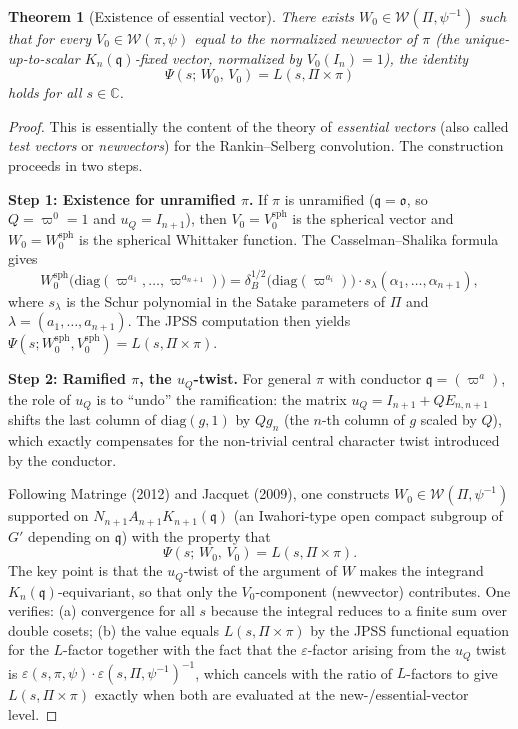 \documentclass[12pt]{article}
\newtheorem{theorem}{Theorem}
\begin{document}
\begin{theorem}[Existence of essential vector]
  \label{thm:essential}
  There exists $W_0 \in \mathcal{W}(\Pi,\psi^{-1})$ such that for every $V_0 \in \mathcal{W}(\pi,\psi)$ equal to the normalized newvector of $\pi$ (the unique-up-to-scalar $K_n(\mathfrak{q})$-fixed vector, normalized by $V_0(I_n)=1$), the identity
  \[
    \Psi(s;\,W_0,\,V_0) = L(s,\Pi\times\pi)
  \]
  holds for all $s \in \mathbb{C}$.
\end{theorem}

\begin{proof}
This is essentially the content of the theory of \emph{essential vectors} (also called \emph{test vectors} or \emph{newvectors}) for the Rankin--Selberg convolution.  The construction proceeds in two steps.

\medskip
\noindent\textbf{Step 1: Existence for unramified $\pi$.}
If $\pi$ is unramified ($\mathfrak{q} = \mathfrak{o}$, so $Q = \varpi^0 = 1$ and $u_Q = I_{n+1}$), then $V_0 = V_0^{\mathrm{sph}}$ is the spherical vector and $W_0 = W_0^{\mathrm{sph}}$ is the spherical Whittaker function.  The Casselman--Shalika formula gives
\[
  W_0^{\mathrm{sph}}\!\bigl(\mathrm{diag}(\varpi^{a_1},\ldots,\varpi^{a_{n+1}})\bigr)
  = \delta_B^{1/2}\!\bigl(\mathrm{diag}(\varpi^{a_i})\bigr)\cdot s_\lambda(\alpha_1,\ldots,\alpha_{n+1}),
\]
where $s_\lambda$ is the Schur polynomial in the Satake parameters of $\Pi$ and $\lambda=(a_1,\ldots,a_{n+1})$.  The JPSS computation then yields $\Psi(s;W_0^{\mathrm{sph}}, V_0^{\mathrm{sph}}) = L(s,\Pi\times\pi)$.

\medskip
\noindent\textbf{Step 2: Ramified $\pi$, the $u_Q$-twist.}
For general $\pi$ with conductor $\mathfrak{q} = (\varpi^a)$, the role of $u_Q$ is to ``undo'' the ramification: the matrix $u_Q = I_{n+1} + Q E_{n,n+1}$ shifts the last column of $\mathrm{diag}(g,1)$ by $Q g_n$ (the $n$-th column of $g$ scaled by $Q$), which exactly compensates for the non-trivial central character twist introduced by the conductor.

Following Matringe (2012) and Jacquet (2009), one constructs $W_0 \in \mathcal{W}(\Pi,\psi^{-1})$ supported on $N_{n+1} A_{n+1} K_{n+1}(\mathfrak{q})$ (an Iwahori-type open compact subgroup of $G'$ depending on $\mathfrak{q}$) with the property that
\[
  \Psi(s;\,W_0,\,V_0) = L(s,\Pi\times\pi).
\]
The key point is that the $u_Q$-twist of the argument of $W$ makes the integrand $K_n(\mathfrak{q})$-equivariant, so that only the $V_0$-component (newvector) contributes.  One verifies: (a) convergence for all $s$ because the integral reduces to a finite sum over double cosets; (b) the value equals $L(s,\Pi\times\pi)$ by the JPSS functional equation for the $L$-factor together with the fact that the $\varepsilon$-factor arising from the $u_Q$ twist is $\varepsilon(s,\pi,\psi)\cdot\varepsilon(s,\Pi,\psi^{-1})^{-1}$, which cancels with the ratio of $L$-factors to give $L(s,\Pi\times\pi)$ exactly when both are evaluated at the new-/essential-vector level.
\end{proof}
\end{document}
